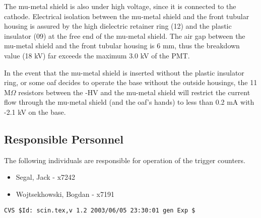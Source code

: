 The mu-metal shield is also under high voltage, since it is connected to the 
cathode. Electrical isolation between the mu-metal shield and the front 
tubular housing is assured by the high dielectric retainer ring (12) and the 
plastic insulator (09) at the free end of the mu-metal shield. The air gap 
between the mu-metal shield and the front tubular housing is 6 mm, thus the 
breakdown value (18 kV) far exceeds the maximum 3.0 kV of the PMT.

In the event that the mu-metal shield is inserted without the plastic insulator 
ring, or some oaf decides to operate the base without the outside housings, the 
11 M$\Omega$ resistors between the -HV and the mu-metal shield will restrict the 
current flow through the mu-metal shield (and the oaf's hands) to less than 0.2 
mA with -2.1 kV on the base. 

\subsection{Responsible Personnel} 
The following individuals are responsible for operation of the trigger counters. 
\begin{itemize}
\item[~]Segal, Jack - x7242 
\item[~]Wojtsekhowski, Bogdan - x7191 
\end{itemize} 








%
%
{\small
\begin{verbatim}CVS $Id: scin.tex,v 1.2 2003/06/05 23:30:01 gen Exp $\end{verbatim}
}
